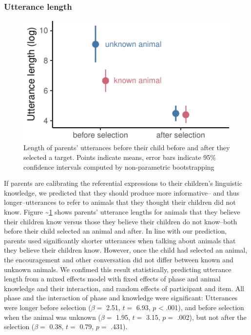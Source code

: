 \documentclass[10pt, letterpaper]{article}
\newenvironment{CodeChunk}{}{}
\begin{document}
\hypertarget{utterance-length}{%
\subsubsection{Utterance length}\label{utterance-length}}

\begin{CodeChunk}
\begin{figure}[tb]
\includegraphics{figs/known_plot-1} \caption[Length of parents' utterances before their child before and after they selected a target]{Length of parents' utterances before their child before and after they selected a target. Points indicate means, error bars indicate 95\% confidence intervals computed by non-parametric bootstrapping}\label{fig:known_plot}
\end{figure}
\end{CodeChunk}

If parents are calibrating the referential expressions to their
children's linguistic knowledge, we predicted that they should produce
more informative-- and thus longer--utterances to refer to animals that
they thought their children did not know. Figure
\textasciitilde{}\ref{fig:known_plot} shows parents' utterance lengths
for animals that they believe their children know versus those they
believe their children do not know--both before their child selected an
animal and after. In line with our prediction, parents used
significantly shorter utterances when talking about animals that they
believe their children know. However, once the child had selected an
animal, the encouragement and other conversation did not differ between
known and unknown animals. We confimed this result statistically,
predicting utterance length from a mixed effects model with fixed
effects of phase and animal knowledge and their interaction, and random
effects of participant and item. All phase and the interaction of phase
and knowledge were significant: Utterances were longer before selection
(\(\beta =\) 2.51, \(t =\) 6.93, \(p\) \textless{} .001), and before
selection when the animal was unknown (\(\beta =\) 1.95, \(t =\) 3.15,
\(p =\) .002), but not after the selection (\(\beta =\) 0.38, \(t =\)
0.79, \(p =\) .431).
\end{document}

